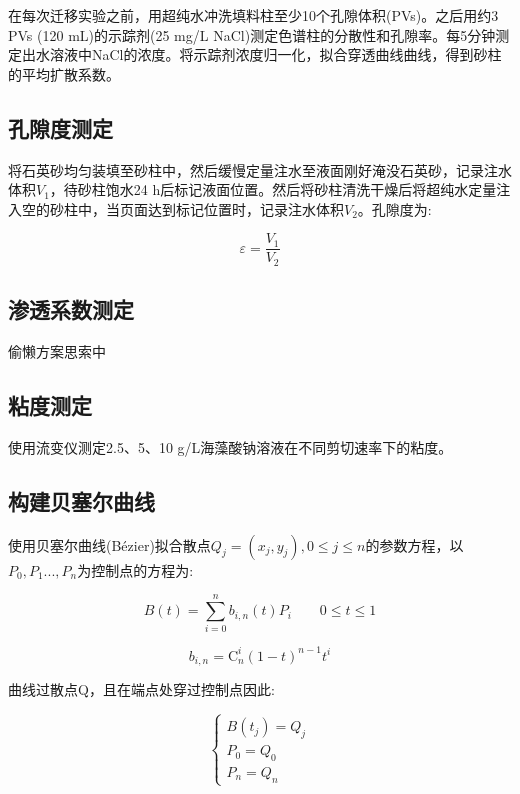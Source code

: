 在每次迁移实验之前，用超纯水冲洗填料柱至少10个孔隙体积(PVs)。之后用约3 PVs (120 mL)的示踪剂(25 mg/L NaCl)测定色谱柱的分散性和孔隙率。每5分钟测定出水溶液中NaCl的浓度。将示踪剂浓度归一化，拟合穿透曲线曲线，得到砂柱的平均扩散系数。

\subsection{孔隙度测定}

将石英砂均匀装填至砂柱中，然后缓慢定量注水至液面刚好淹没石英砂，记录注水体积$V_1$，待砂柱饱水24 h后标记液面位置。然后将砂柱清洗干燥后将超纯水定量注入空的砂柱中，当页面达到标记位置时，记录注水体积$V_2$。孔隙度为:

\begin{equation}
    \varepsilon=\frac{V_1}{V_2}
\end{equation}

\subsection{渗透系数测定}

偷懒方案思索中

\subsection{粘度测定}

使用流变仪测定2.5、5、10 g/L海藻酸钠溶液在不同剪切速率下的粘度。


\subsection{构建贝塞尔曲线}\label{beziercurve}

使用贝塞尔曲线(B\'{e}zier)拟合散点$Q_j=(x_j,y_j),0\leqslant j\leqslant n$的参数方程，以$P_0,P_1...,P_n$为控制点的方程为:

\begin{equation}\label{bezier-1}
    B(t)=\sum_{i = 0}^{n}b_{i,n}(t)P_i \qquad 0\leqslant t\leqslant1 
\end{equation}

\begin{equation}
    b_{i,n}=\mathrm{C}^i_n(1-t)^{n-1}t^i
\end{equation}

曲线过散点Q，且在端点处穿过控制点因此:

\begin{equation}\label{bezier-2}
    \left\{
        \begin{array}{lcl}
            B(t_j)=Q_j\\
            P_0=Q_0\\
            P_n=Q_n    
        \end{array}      
    \right.
\end{equation}


